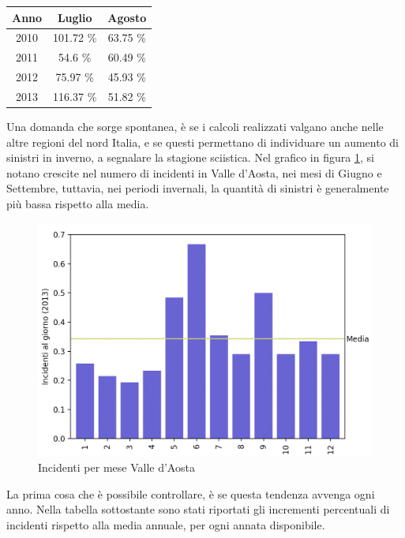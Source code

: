 \documentclass[a4paper,12pt]{report}
\begin{document}
\begin{center}
    \def\arraystretch{1.5}%
    \begin{tabular}{ |c|c|c| } 
    \hline
    Anno & Luglio   & Agosto \\ 
    \hline
    \rowcolor{TableGray}
    2010 & 101.72 \% & 63.75 \% \\ 
    2011 & 54.6  \%  & 60.49 \% \\
    \rowcolor{TableGray}
    2012 & 75.97 \%  & 45.93 \%\\
    2013 & 116.37 \% & 51.82 \%\\
    \hline
    \end{tabular}
\end{center}

Una domanda che sorge spontanea, è se i calcoli realizzati valgano anche nelle altre 
regioni del nord Italia, e se questi permettano di individuare un aumento di sinistri in 
inverno, a segnalare la stagione sciistica. 
Nel grafico in figura \ref{fig:aosta}, si notano crescite nel numero di incidenti 
in Valle d'Aosta, nei mesi di Giugno e Settembre, tuttavia, nei periodi invernali, 
la quantità di sinistri è generalmente più bassa rispetto alla media. 

\begin{figure}
    \includegraphics[width=\linewidth]{../src/incidenti/incidenti_senza_coords/mese_incidenti/aosta_mese.png}
    \caption{Incidenti per mese Valle d'Aosta}
    \label{fig:aosta}
\end{figure}

La prima cosa che è possibile controllare, è se questa tendenza avvenga ogni anno. 
Nella tabella sottostante sono stati riportati gli incrementi percentuali di incidenti 
rispetto alla media annuale, per ogni annata disponibile. 
\end{document}
